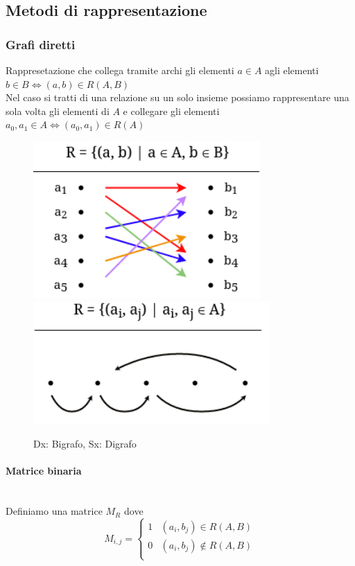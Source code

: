 \documentclass{report}
\newcommand{\subsubsubsection}[1]{\paragraph{#1}\mbox{}\\}
\begin{document}
    \subsection{Metodi di rappresentazione}
        \subsubsection{Grafi diretti}
            Rappresetazione che collega tramite archi gli elementi $a \in A$ agli elementi
            $b \in B \Longleftrightarrow \left(a, b\right) \in R\left(A, B\right)$ \\
            Nel caso si tratti di una relazione su un solo insieme possiamo rappresentare
            una sola volta gli elementi di $A$ e collegare gli elementi $a_0, a_1 \in A 
            \Longleftrightarrow \left(a_0, a_1\right) \in R\left(A\right)$
            \begin{center}
                \begin{figure}[H]
                    \includegraphics[width=.5\textwidth]{bigrafo.png}
                    \includegraphics[width=.5\textwidth]{digrafo.png}
                    \caption{Dx: Bigrafo, Sx: Digrafo}
                \end{figure}
            \end{center}
        \subsubsubsection{Matrice binaria}
            Definiamo una matrice $M_R$ dove 
            $$M_{i,j} = \begin{cases}
                1 & \left(a_i, b_j\right) \in R\left(A, B\right) \\
                0 & \left(a_i, b_j\right) \notin R\left(A, B\right) \\
            \end{cases}$$
\end{document}
